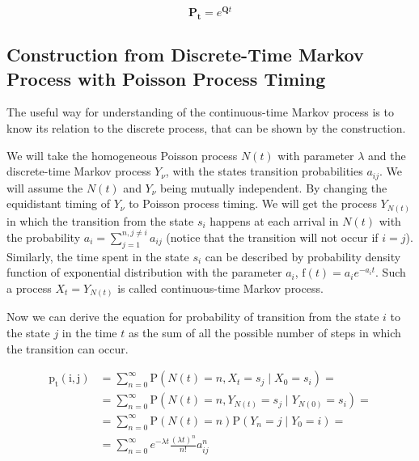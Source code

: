 \documentclass[thesis=M,english]{FITthesis}[2012/10/20]
\newcommand{\matr}[1]{\mathbf{#1}}
\begin{document}
\begin{equation}\label{eq:mexp}
\matr{P_{t}} = e^{\matr{Q}t}  
\end{equation}


\subsection{Construction from Discrete-Time Markov Process with Poisson Process Timing } 

The useful way for understanding of the continuous-time Markov process is to know its relation to the discrete process, that can be shown by the construction.

We will take the homogeneous Poisson process $N(t)$ with parameter $\lambda$ and the discrete-time Markov process $Y_{\nu}$, with the states transition probabilities $a_{ij}$. We will assume the $N(t)$ and $Y_{\nu}$ being mutually independent. By changing the equidistant timing of $Y_{\nu}$ to Poisson process timing. We will get the process $Y_{N(t)}$ in which the transition from the state $s_i$ happens at each arrival in $N(t)$ with the probability $a_i = \sum_{j = 1}^{ n ,j \neq i} a_{ij}$ (notice that the transition will not occur if $i=j$). Similarly, the time spent in the state $s_i$ can be described by probability density function of exponential distribution with the parameter $a_i$, $\mathrm{f}(t)= a_i e^{-a_i t}$. Such a process $X_t = Y_{N(t)}$ is called continuous-time Markov process.

Now we can derive the equation for probability of transition from the state $i$ to the state $j$ in the time $t$ as the sum of all the possible number of steps in which the transition can occur. 

\begin{equation}
\begin{aligned}
\mathrm{p_t(i,j)} &= \sum_{n=0}^{\infty} \mathrm{P}( N(t) = n, X_t = s_j \mid X_0 = s_i )  = \\
                  &= \sum_{n=0}^{\infty} \mathrm{P}( N(t) = n, Y_{N(t)} = s_j \mid Y_{N(0)} = s_i )  = \\
                  &= \sum_{n=0}^{\infty} \mathrm{P}( N(t) = n ) \mathrm{P}( Y_n = j \mid Y_0 = i )  = \\
				  &= \sum_{n=0}^{\infty} e^{-\lambda t} \frac{ (\lambda t)^n}{n!} a_{ij}^n  
\end{aligned}
\end{equation} 
\end{document}
